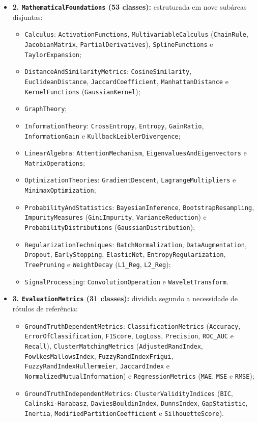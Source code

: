 \documentclass[11pt,a4paper]{article}
\newcommand{\onto}[1]{\texttt{\small #1}}
\begin{document}
{\begin{itemize}[leftmargin=*,nosep]
  \item \textbf{2. \onto{MathematicalFoundations} (53 classes):} estruturada em nove subáreas disjuntas:
    \begin{itemize}[leftmargin=1.2em,nosep]
      \item \onto{Calculus}: \onto{ActivationFunctions}, \onto{MultivariableCalculus} (\onto{ChainRule}, \onto{JacobianMatrix}, \onto{PartialDerivatives}), \onto{SplineFunctions} e \onto{TaylorExpansion};
      \item \onto{DistanceAndSimilarityMetrics}: \onto{CosineSimilarity}, \onto{EuclideanDistance}, \onto{JaccardCoefficient}, \onto{ManhattanDistance} e \onto{KernelFunctions} (\onto{GaussianKernel});
      \item \onto{GraphTheory};
      \item \onto{InformationTheory}: \onto{CrossEntropy}, \onto{Entropy}, \onto{GainRatio}, \onto{InformationGain} e \onto{KullbackLeiblerDivergence};
      \item \onto{LinearAlgebra}: \onto{AttentionMechanism}, \onto{EigenvaluesAndEigenvectors} e \onto{MatrixOperations};
      \item \onto{OptimizationTheories}: \onto{GradientDescent}, \onto{LagrangeMultipliers} e \onto{MinimaxOptimization};
      \item \onto{ProbabilityAndStatistics}: \onto{BayesianInference}, \onto{BootstrapResampling}, \onto{ImpurityMeasures} (\onto{GiniImpurity}, \onto{VarianceReduction}) e \onto{ProbabilityDistributions} (\onto{GaussianDistribution});
      \item \onto{RegularizationTechniques}: \onto{BatchNormalization}, \onto{DataAugmentation}, \onto{Dropout}, \onto{EarlyStopping}, \onto{ElasticNet}, \onto{EntropyRegularization}, \onto{TreePruning} e \onto{WeightDecay} (\onto{L1\_Reg}, \onto{L2\_Reg});
      \item \onto{SignalProcessing}: \onto{ConvolutionOperation} e \onto{WaveletTransform}.
    \end{itemize}

  \item \textbf{3. \onto{EvaluationMetrics} (31 classes):} dividida segundo a necessidade de rótulos de referência:
    \begin{itemize}[leftmargin=1.2em,nosep]
      \item \onto{GroundTruthDependentMetrics}: \onto{ClassificationMetrics} (\onto{Accuracy}, \onto{ErrorOfClassification}, \onto{F1Score}, \onto{LogLoss}, \onto{Precision}, \onto{ROC\_AUC} e \onto{Recall}), \onto{ClusterMatchingMetrics} (\onto{AdjustedRandIndex}, \onto{FowlkesMallowsIndex}, \onto{FuzzyRandIndexFrigui}, \onto{FuzzyRandIndexHullermeier}, \onto{JaccardIndex} e \onto{NormalizedMutualInformation}) e \onto{RegressionMetrics} (\onto{MAE}, \onto{MSE} e \onto{RMSE});
      \item \onto{GroundTruthIndependentMetrics}: \onto{ClusterValidityIndices} (\onto{BIC}, \onto{Calinski-Harabasz}, \onto{DaviesBouldinIndex}, \onto{DunnsIndex}, \onto{GapStatistic}, \onto{Inertia}, \onto{ModifiedPartitionCoefficient} e \onto{SilhouetteScore}).
    \end{itemize}


\end{itemize}}
\end{document}
